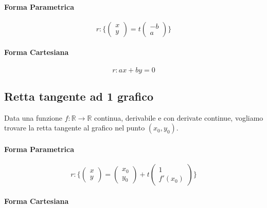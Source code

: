 \documentclass{article}
\begin{document}
\paragraph{Forma Parametrica}

\begin{equation*}
    r: \{
    \begin{pmatrix}
        x \\
        y
    \end{pmatrix} = t
    \begin{pmatrix}
        -b \\
        a
    \end{pmatrix}
    \}
\end{equation*}

\paragraph{Forma Cartesiana}

\begin{equation*}
    r: ax + by = 0
\end{equation*}

\subsection{Retta tangente ad 1 grafico}

Data una funzione $f: \mathbb{R} \to \mathbb{R}$ continua, derivabile e con derivate continue, vogliamo trovare la retta tangente al grafico nel punto $(x_0, y_0)$.

\paragraph{Forma Parametrica}

\begin{equation*}
    r: \{
    \begin{pmatrix}
        x \\
        y
    \end{pmatrix} =
    \begin{pmatrix}
        x_0 \\
        y_0
    \end{pmatrix} + t
    \begin{pmatrix}
        1 \\
        f'(x_0)
    \end{pmatrix}
    \}
\end{equation*}

\paragraph{Forma Cartesiana}
\end{document}
